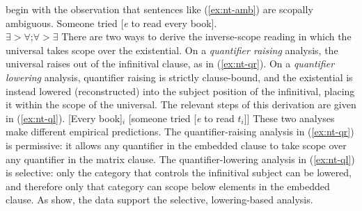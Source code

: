 \documentclass[12pt]{article}
\begin{document}
\citeauthor{neeleman2006} begin with the observation that sentences like (\ref{ex:nt-amb}) are scopally ambiguous.
%
\ex\label{ex:nt-amb}
Someone tried [\emph{e} to read every book].\\
$\exists > \forall$;\quad $\forall > \exists$
\xe
%
There are two ways to derive the inverse-scope reading in which the universal takes scope over the existential. On a \emph{quantifier raising} analysis, the universal raises out of the infinitival clause, as in (\ref{ex:nt-qr}). On a \emph{quantifier lowering} analysis, quantifier raising is strictly clause-bound, and the existential is instead lowered (reconstructed) into the subject position of the infinitival, placing it within the scope of the universal. The relevant steps of this derivation are given in (\ref{ex:nt-ql}).
%
\pex\label{ex:nt-two-analyses}
\a\label{ex:nt-qr} {[Every book]$_i$} [someone tried [\emph{e} to read $t_i$]]
\a\label{ex:nt-ql}
\xe
%
These two analyses make different empirical predictions. The quantifier-raising analysis in (\ref{ex:nt-qr}) is permissive: it allows any quantifier in the embedded clause to take scope over any quantifier in the matrix clause. The quantifier-lowering analysis in (\ref{ex:nt-ql}) is selective: only the category that controls the infinitival subject can be lowered, and therefore only that category can scope below elements in the embedded clause. As \citeauthor{neeleman2006} show, the data support the selective, lowering-based analysis.
\end{document}
